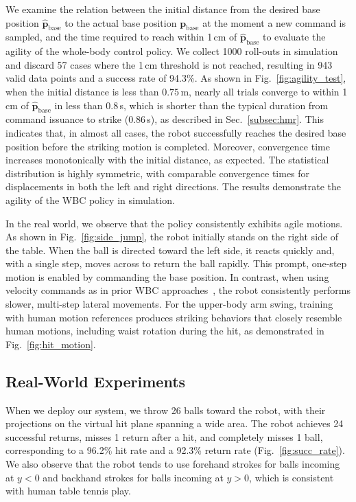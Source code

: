 We examine the relation between the initial distance from the desired base position $\hat{\mathbf{p}}_{\mathrm{base}}$ to the actual base position $\mathbf{p}_{\mathrm{base}}$ at the moment a new command is sampled, and the time required to reach within 1\,cm of $\hat{\mathbf{p}}_{\mathrm{base}}$ to evaluate the agility of the whole-body control policy. We collect 1000 roll-outs in simulation and discard 57 cases where the 1\,cm threshold is not reached, resulting in 943 valid data points and a success rate of 94.3\%. As shown in Fig.~\ref{fig:agility_test}, when the initial distance is less than $0.75$\,m, nearly all trials converge to within 1\,cm of $\hat{\mathbf{p}}_{\mathrm{base}}$ in less than 0.8\,s, which is shorter than the typical duration from command issuance to strike (0.86\,s), as described in Sec.~\ref{subsec:hmr}. This indicates that, in almost all cases, the robot successfully reaches the desired base position before the striking motion is completed. Moreover, convergence time increases monotonically with the initial distance, as expected. The statistical distribution is highly symmetric, with comparable convergence times for displacements in both the left and right directions. The results demonstrate the agility of the WBC policy in simulation.

In the real world, we observe that the policy consistently exhibits agile motions. As shown in Fig.~\ref{fig:side_jump}, the robot initially stands on the right side of the table. When the ball is directed toward the left side, it reacts quickly and, with a single step, moves across to return the ball rapidly. This prompt, one-step motion is enabled by commanding the base position. In contrast, when using velocity commands as in prior WBC approaches~\cite{cheng2024expressive}, the robot consistently performs slower, multi-step lateral movements. For the upper-body arm swing, training with human motion references produces striking behaviors that closely resemble human motions, including waist rotation during the hit, as demonstrated in Fig.~\ref{fig:hit_motion}.

\subsection{Real-World Experiments}
When we deploy our system, we throw 26 balls toward the robot, with their projections on the virtual hit plane spanning a wide area. The robot achieves 24 successful returns, misses 1 return after a hit, and completely misses 1 ball, corresponding to a 96.2\% hit rate and a 92.3\% return rate (Fig.~\ref{fig:succ_rate}). We also observe that the robot tends to use forehand strokes for balls incoming at $y < 0$ and backhand strokes for balls incoming at $y > 0$, which is consistent with human table tennis play.

